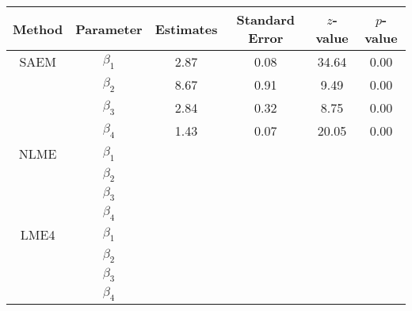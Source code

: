 \begin{table}[ht]
\centering
\begin{tabular}{cccccc}
  \hline
Method & Parameter & Estimates & Standard Error & $z$-value & $p$-value \\ 
  \hline
SAEM & $\beta_1$ & 2.87 & 0.08 & 34.64 & 0.00 \\ 
   & $\beta_2$ & 8.67 & 0.91 & 9.49 & 0.00 \\ 
   & $\beta_3$ & 2.84 & 0.32 & 8.75 & 0.00 \\ 
   & $\beta_4$ & 1.43 & 0.07 & 20.05 & 0.00 \\ 
  NLME & $\beta_1$ &  &  &  &  \\ 
   & $\beta_2$ &  &  &  &  \\ 
   & $\beta_3$ &  &  &  &  \\ 
   & $\beta_4$ &  &  &  &  \\ 
  LME4 & $\beta_1$ &  &  &  &  \\ 
   \hline
 & $\beta_2$ &  &  &  &  \\ 
   & $\beta_3$ &  &  &  &  \\ 
   & $\beta_4$ &  &  &  &  \\ 
  \end{tabular}
\end{table}

